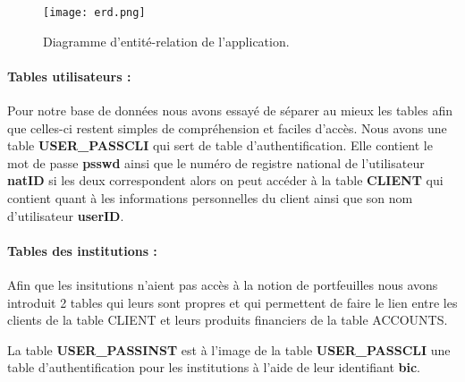 \documentclass[../rapport.tex]{subfiles}
\begin{document}
	
	\begin{figure}[h]
		\centering \texttt{[image: erd.png]}
		\caption{Diagramme d'entité-relation de l'application.}
	\end{figure}
	
	\paragraph{Tables utilisateurs :}
	Pour notre base de données nous avons essayé de séparer au mieux les tables afin que celles-ci restent simples de compréhension et faciles d'accès. Nous avons une table \textbf{USER\_PASSCLI} qui sert de table d'authentification. Elle contient le mot de passe \textbf{psswd} ainsi que le numéro de registre national de l'utilisateur \textbf{natID} si les deux correspondent alors on peut accéder à la table \textbf{CLIENT} qui contient quant à les informations personnelles du client ainsi que son nom d'utilisateur \textbf{userID}.
	
	\paragraph{Tables des institutions :} Afin que les insitutions n'aient pas accès à la notion de portfeuilles nous avons introduit 2 tables qui leurs sont propres et qui permettent de faire le lien entre les clients de la table CLIENT et leurs produits financiers de la table ACCOUNTS.
	
	\medskip
	
	La table \textbf{USER\_PASSINST} est à l'image de la table \textbf{USER\_PASSCLI} une table d'authentification pour les institutions à l'aide de leur identifiant \textbf{bic}. 
	
\end{document}
